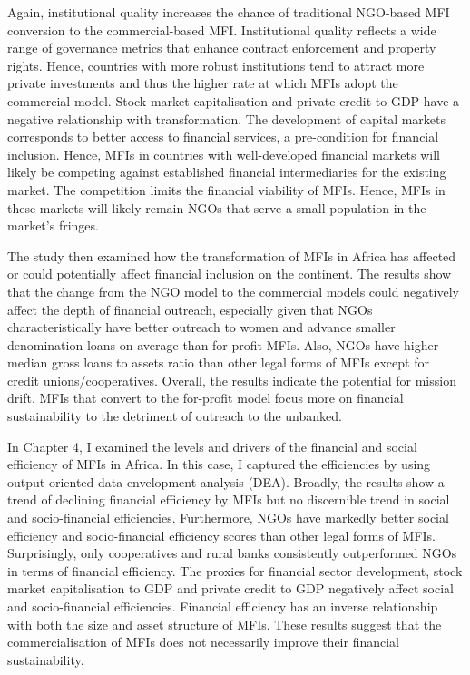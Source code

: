 \documentclass[a4paper, nobind]{templates/ociamthesis}
\begin{document}
Again, institutional quality increases the chance of traditional NGO-based MFI conversion to the commercial-based MFI. Institutional quality reflects a wide range of governance metrics that enhance contract enforcement and property rights. Hence, countries with more robust institutions tend to attract more private investments and thus the higher rate at which MFIs adopt the commercial model. Stock market capitalisation and private credit to GDP have a negative relationship with transformation. The development of capital markets corresponds to better access to financial services, a pre-condition for financial inclusion. Hence, MFIs in countries with well-developed financial markets will likely be competing against established financial intermediaries for the existing market. The competition limits the financial viability of MFIs. Hence, MFIs in these markets will likely remain NGOs that serve a small population in the market's fringes.

The study then examined how the transformation of MFIs in Africa has affected or could potentially affect financial inclusion on the continent. The results show that the change from the NGO model to the commercial models could negatively affect the depth of financial outreach, especially given that NGOs characteristically have better outreach to women and advance smaller denomination loans on average than for-profit MFIs. Also, NGOs have higher median gross loans to assets ratio than other legal forms of MFIs except for credit unions/cooperatives. Overall, the results indicate the potential for mission drift. MFIs that convert to the for-profit model focus more on financial sustainability to the detriment of outreach to the unbanked.

In Chapter 4, I examined the levels and drivers of the financial and social efficiency of MFIs in Africa. In this case, I captured the efficiencies by using output-oriented data envelopment analysis (DEA). Broadly, the results show a trend of declining financial efficiency by MFIs but no discernible trend in social and socio-financial efficiencies. Furthermore, NGOs have markedly better social efficiency and socio-financial efficiency scores than other legal forms of MFIs. Surprisingly, only cooperatives and rural banks consistently outperformed NGOs in terms of financial efficiency. The proxies for financial sector development, stock market capitalisation to GDP and private credit to GDP negatively affect social and socio-financial efficiencies. Financial efficiency has an inverse relationship with both the size and asset structure of MFIs. These results suggest that the commercialisation of MFIs does not necessarily improve their financial sustainability.
\end{document}
